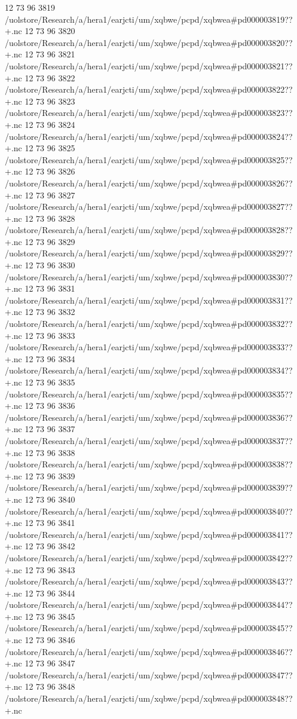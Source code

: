 12 73 96
3819
/uolstore/Research/a/hera1/earjcti/um/xqbwe/pcpd/xqbwea#pd000003819??+.nc
12 73 96
3820
/uolstore/Research/a/hera1/earjcti/um/xqbwe/pcpd/xqbwea#pd000003820??+.nc
12 73 96
3821
/uolstore/Research/a/hera1/earjcti/um/xqbwe/pcpd/xqbwea#pd000003821??+.nc
12 73 96
3822
/uolstore/Research/a/hera1/earjcti/um/xqbwe/pcpd/xqbwea#pd000003822??+.nc
12 73 96
3823
/uolstore/Research/a/hera1/earjcti/um/xqbwe/pcpd/xqbwea#pd000003823??+.nc
12 73 96
3824
/uolstore/Research/a/hera1/earjcti/um/xqbwe/pcpd/xqbwea#pd000003824??+.nc
12 73 96
3825
/uolstore/Research/a/hera1/earjcti/um/xqbwe/pcpd/xqbwea#pd000003825??+.nc
12 73 96
3826
/uolstore/Research/a/hera1/earjcti/um/xqbwe/pcpd/xqbwea#pd000003826??+.nc
12 73 96
3827
/uolstore/Research/a/hera1/earjcti/um/xqbwe/pcpd/xqbwea#pd000003827??+.nc
12 73 96
3828
/uolstore/Research/a/hera1/earjcti/um/xqbwe/pcpd/xqbwea#pd000003828??+.nc
12 73 96
3829
/uolstore/Research/a/hera1/earjcti/um/xqbwe/pcpd/xqbwea#pd000003829??+.nc
12 73 96
3830
/uolstore/Research/a/hera1/earjcti/um/xqbwe/pcpd/xqbwea#pd000003830??+.nc
12 73 96
3831
/uolstore/Research/a/hera1/earjcti/um/xqbwe/pcpd/xqbwea#pd000003831??+.nc
12 73 96
3832
/uolstore/Research/a/hera1/earjcti/um/xqbwe/pcpd/xqbwea#pd000003832??+.nc
12 73 96
3833
/uolstore/Research/a/hera1/earjcti/um/xqbwe/pcpd/xqbwea#pd000003833??+.nc
12 73 96
3834
/uolstore/Research/a/hera1/earjcti/um/xqbwe/pcpd/xqbwea#pd000003834??+.nc
12 73 96
3835
/uolstore/Research/a/hera1/earjcti/um/xqbwe/pcpd/xqbwea#pd000003835??+.nc
12 73 96
3836
/uolstore/Research/a/hera1/earjcti/um/xqbwe/pcpd/xqbwea#pd000003836??+.nc
12 73 96
3837
/uolstore/Research/a/hera1/earjcti/um/xqbwe/pcpd/xqbwea#pd000003837??+.nc
12 73 96
3838
/uolstore/Research/a/hera1/earjcti/um/xqbwe/pcpd/xqbwea#pd000003838??+.nc
12 73 96
3839
/uolstore/Research/a/hera1/earjcti/um/xqbwe/pcpd/xqbwea#pd000003839??+.nc
12 73 96
3840
/uolstore/Research/a/hera1/earjcti/um/xqbwe/pcpd/xqbwea#pd000003840??+.nc
12 73 96
3841
/uolstore/Research/a/hera1/earjcti/um/xqbwe/pcpd/xqbwea#pd000003841??+.nc
12 73 96
3842
/uolstore/Research/a/hera1/earjcti/um/xqbwe/pcpd/xqbwea#pd000003842??+.nc
12 73 96
3843
/uolstore/Research/a/hera1/earjcti/um/xqbwe/pcpd/xqbwea#pd000003843??+.nc
12 73 96
3844
/uolstore/Research/a/hera1/earjcti/um/xqbwe/pcpd/xqbwea#pd000003844??+.nc
12 73 96
3845
/uolstore/Research/a/hera1/earjcti/um/xqbwe/pcpd/xqbwea#pd000003845??+.nc
12 73 96
3846
/uolstore/Research/a/hera1/earjcti/um/xqbwe/pcpd/xqbwea#pd000003846??+.nc
12 73 96
3847
/uolstore/Research/a/hera1/earjcti/um/xqbwe/pcpd/xqbwea#pd000003847??+.nc
12 73 96
3848
/uolstore/Research/a/hera1/earjcti/um/xqbwe/pcpd/xqbwea#pd000003848??+.nc
